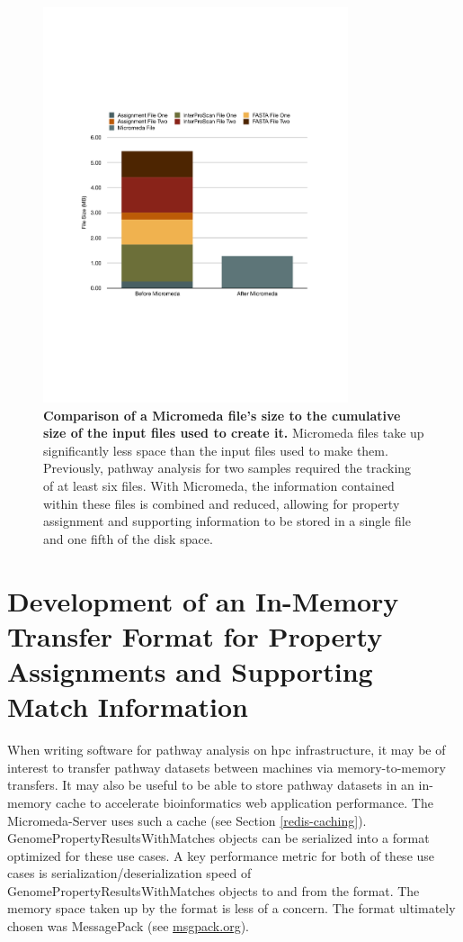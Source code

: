 \begin{figure}[!ht]
  \centering
	\includegraphics[width=0.80\textwidth]{media/micromeda_file_size.pdf}
	 \caption[Comparison of a Micromeda file's size to the cumulative size of the 
input files used to create it.]{\textbf{Comparison of a Micromeda file's size to 
the cumulative size of the input files used to create it.} Micromeda files take 
up significantly less space than the input files used to make them. Previously, 
pathway analysis for two samples required the tracking of at least six files. 
With Micromeda, the information contained within these files is combined and 
reduced, allowing for property assignment and supporting information to be 
stored in a single file and one fifth of the disk space.}
	 \label{fig:micromedafilesize}
\end{figure}

\section{Development of an In-Memory Transfer Format for Property Assignments 
and Supporting Match Information} \label{msgpack}

When writing software for pathway analysis on \gls{hpc} infrastructure, it may 
be of interest to transfer pathway datasets between machines via 
memory-to-memory transfers. It may also be useful to be able to store pathway 
datasets in an in-memory cache to accelerate bioinformatics web application 
performance. The Micromeda-Server uses such a cache (see Section 
\ref{redis-caching}). GenomePropertyResultsWithMatches objects can be serialized 
into a format optimized for these use cases. A key performance metric for both 
of these use cases is serialization/deserialization speed of 
GenomePropertyResultsWithMatches objects to and from the format. The memory 
space taken up by the format is less of a concern. The format ultimately chosen 
was MessagePack  \cite{furuhashi2013messagepack}(see 
\href{http://msgpack.org}{msgpack.org}).

